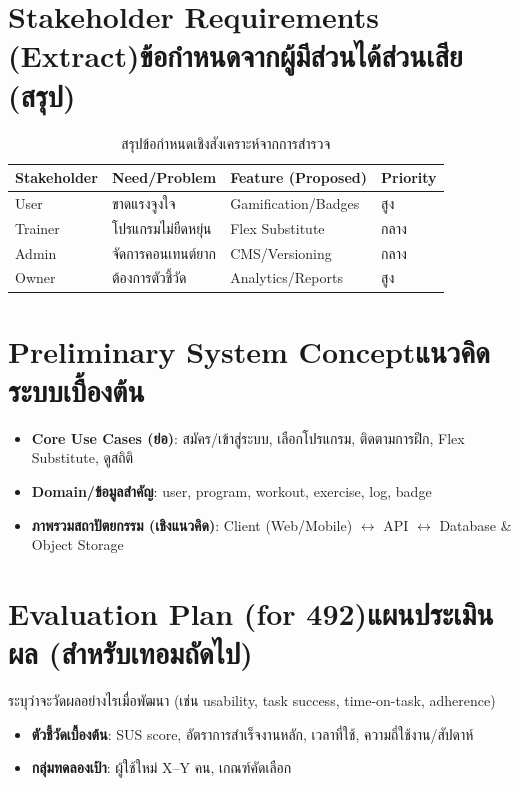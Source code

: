 \section{\ifenglish Stakeholder Requirements (Extract)\else ข้อกำหนดจากผู้มีส่วนได้ส่วนเสีย (สรุป)\fi}
\begin{table}[h]
\centering
\begin{tabular}{@{}llll@{}}
\toprule
\textbf{Stakeholder} & \textbf{Need/Problem} & \textbf{Feature (Proposed)} & \textbf{Priority} \\
\midrule
User   & ขาดแรงจูงใจ & Gamification/Badges & สูง \\
Trainer& โปรแกรมไม่ยืดหยุ่น & Flex Substitute & กลาง \\
Admin  & จัดการคอนเทนต์ยาก & CMS/Versioning & กลาง \\
Owner  & ต้องการตัวชี้วัด & Analytics/Reports & สูง \\
\bottomrule
\end{tabular}
\caption{สรุปข้อกำหนดเชิงสังเคราะห์จากการสำรวจ}
\label{tab:stake-req}
\end{table}

\section{\ifenglish Preliminary System Concept\else แนวคิดระบบเบื้องต้น\fi}
\begin{itemize}
  \item \textbf{Core Use Cases (ย่อ)}: สมัคร/เข้าสู่ระบบ, เลือกโปรแกรม, ติดตามการฝึก, Flex Substitute, ดูสถิติ
  \item \textbf{Domain/ข้อมูลสำคัญ}: user, program, workout, exercise, log, badge
  \item \textbf{ภาพรวมสถาปัตยกรรม (เชิงแนวคิด)}: Client (Web/Mobile) $\leftrightarrow$ API $\leftrightarrow$ Database \& Object Storage
\end{itemize}

\section{\ifenglish Evaluation Plan (for 492)\else แผนประเมินผล (สำหรับเทอมถัดไป)\fi}
ระบุว่าจะวัดผลอย่างไรเมื่อพัฒนา (เช่น usability, task success, time-on-task, adherence)
\begin{itemize}
  \item \textbf{ตัวชี้วัดเบื้องต้น}: SUS score, อัตราการสำเร็จงานหลัก, เวลาที่ใช้, ความถี่ใช้งาน/สัปดาห์
  \item \textbf{กลุ่มทดลองเป้า}: ผู้ใช้ใหม่ X–Y คน, เกณฑ์คัดเลือก
\end{itemize}

